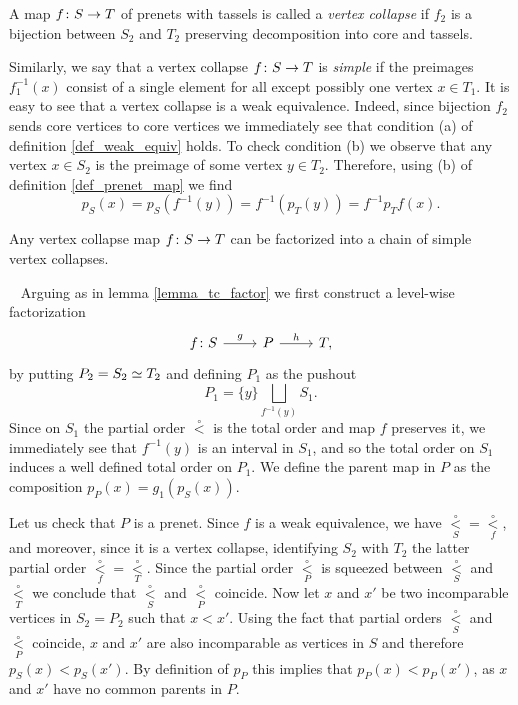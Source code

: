 \documentclass[letterpaper,12pt,leqno]{article}
\numberwithin{equation}{theorem}
\def\proof{\noindent{\em Proof:}\ }
\def\lesub{\mathop{<}\limits}
\def\pless{\lesub^\circ}
\begin{document}
\begin{definition}
\label{def_vc}
A map $f\colon S \to T$ of prenets with tassels is called a {\em vertex collapse} if $f_2$ is a bijection between $S_2$ and $T_2$ preserving decomposition into core and tassels.
\end{definition}

Similarly, we say that a vertex collapse $f\colon S \to T$ is {\em simple} if the preimages $f_1^{-1}(x)$ consist of a single element for all except possibly one vertex $x \in T_1$.
It is easy to see that a vertex collapse is a weak equivalence. Indeed, since bijection $f_2$ sends core vertices to core vertices we immediately see that condition (a) of definition
\ref{def_weak_equiv} holds. To check condition (b) we observe that any vertex $x \in S_2$ is the preimage of some vertex $y \in T_2$. Therefore, using (b) of definition \ref{def_prenet_map}
we find
$$
p_S(x) = p_S(f^{-1}(y)) = f^{-1}(p_T(y)) = f^{-1} p_T f(x).
$$


\begin{lemma}
\label{lemma_vc_factor}
Any vertex collapse map $f\colon S \to T$ can be factorized into a chain of simple vertex collapses.
\end{lemma}
\proof
Arguing as in lemma \ref{lemma_tc_factor} we first construct a level-wise factorization
$$
\begin{tikzcd}
f\from S \ar[r, "g"] & P \ar[r, "h"] & T,
\end{tikzcd}
$$
by putting $P_2 = S_2 \simeq T_2$ and defining $P_1$ as the pushout
$$
P_1 = \{y\} \bigsqcup_{f^{-1}(y)} S_1.
$$
Since on $S_1$ the partial order $\pless$ is the total order and map $f$ preserves it, we immediately see that $f^{-1}(y)$ is
an interval in $S_1$, and so the total order on $S_1$ induces a well defined total order on $P_1$. We define the parent map in $P$ as the composition $p_P(x) = g_1(p_S(x))$.

Let us check that $P$ is a prenet. Since $f$ is a weak equivalence, we have $\pless_S = \pless_f$, and moreover, since it is a vertex collapse, identifying $S_2$ with $T_2$
the latter partial order $\pless_f = \pless_T$. Since the partial order $\pless_P$ is squeezed between $\pless_S$ and $\pless_T$ we conclude that $\pless_S$ and $\pless_P$ coincide.
Now let $x$ and $x'$ be two incomparable vertices in $S_2 = P_2$ such that $x < x'$. Using the fact that partial orders $\pless_S$ and $\pless_P$ coincide, $x$ and $x'$ are also incomparable as vertices in $S$
and therefore $p_S(x) < p_S(x')$. By definition of $p_P$ this implies that $p_P(x) < p_P(x')$, as $x$ and $x'$ have no common parents in $P$.
\end{document}
